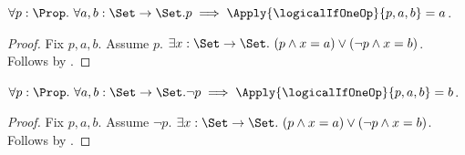 \begin{proposition}\label{logical_if_one_true}
    $\forall p:\Prop.\ \forall a,b:\Set\to\Set.
        p\implies
        \Apply{\logicalIfOneOp}{p,a,b}=a$.
\end{proposition}
\begin{proof}
    Fix $p,a,b$.
    Assume $p$.
    $\exists x:\Set\to\Set.\ (p\land x=a)\lor(\lnot p\land x=b)$.
    Follows by .
\end{proof}

\begin{proposition}\label{logical_if_one_false}
    $\forall p:\Prop.\ \forall a,b:\Set\to\Set.
        \lnot p\implies
        \Apply{\logicalIfOneOp}{p,a,b}=b$.
\end{proposition}
\begin{proof}
    Fix $p,a,b$.
    Assume $\lnot p$.
    $\exists x:\Set\to\Set.\ (p\land x=a)\lor(\lnot p\land x=b)$.
    Follows by .
\end{proof}
